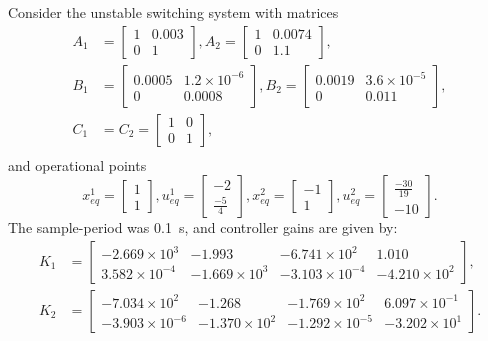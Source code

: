 Consider the unstable switching system with matrices
%
\begin{align*}
  A_1 & =
  \begin{bmatrix}
    1 & 0.003 \\
    0 & 1
  \end{bmatrix},
  A_2 = \begin{bmatrix}
    1 & 0.0074 \\
    0 & 1.1
  \end{bmatrix}, \\
  B_1 & =
  \begin{bmatrix}
    0.0005 & 1.2\times{}10^{-6} \\
    0      & 0.0008
  \end{bmatrix},
  B_2 = \begin{bmatrix}
    0.0019 & 3.6\times{}10^{-5} \\
    0      & 0.011
  \end{bmatrix}, \\
  C_1 & = C_2 =
  \begin{bmatrix}
    1 & 0 \\
    0 & 1
  \end{bmatrix},       \\
\end{align*}
%
and operational points
%
\[
  x_{eq}^1 = \begin{bmatrix}
    1 \\ 1
  \end{bmatrix},
  u_{eq}^1 = \begin{bmatrix}
    -2 \\ \frac{-5}{4}
  \end{bmatrix},
  x_{eq}^2 = \begin{bmatrix}
    -1 \\ 1
  \end{bmatrix},
  u_{eq}^2 = \begin{bmatrix}
    \frac{-30}{19} \\ -10
  \end{bmatrix}.
\]
%
The sample-period was \SI{0.1}{\second}, and controller gains are given by:
%
\scriptsize
\begin{align*}
  K_1 & = \begin{bmatrix}
    -2.669\times{}10^3   & -1.993            & -6.741\times{}10^2    & 1.010             \\
    3.582\times{}10^{-4} & -1.669\times{}10^3 & -3.103\times{}10^{-4} & -4.210\times{}10^2
  \end{bmatrix}, \\
  K_2 & = \begin{bmatrix}
    -7.034\times{}10^2    & -1.268            & -1.769\times{}10^2    & 6.097\times{}10^{-1} \\
    -3.903\times{}10^{-6} & -1.370\times{}10^2 & -1.292\times{}10^{-5} & -3.202\times{}10^1
  \end{bmatrix}.
\end{align*}
\normalsize

